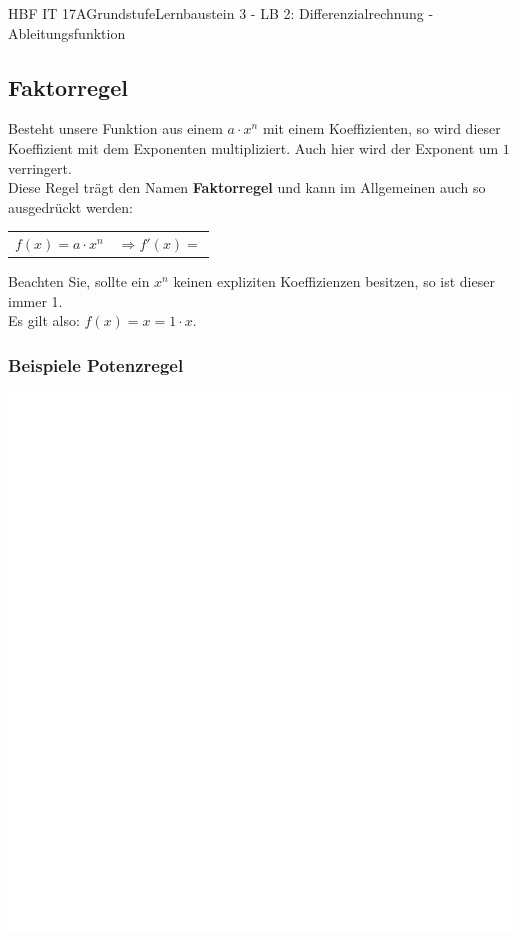 \documentclass[11pt,twocolumn,oneside,openany,headings=optiontotoc,11pt,numbers=noenddot]{article}
\begin{document}
\begin{worksheet}{HBF IT 17A}{Grundstufe}{Lernbaustein 3 - LB 2: Differenzialrechnung - Ableitungsfunktion}
		\subsection{Faktorregel}
		Besteht unsere Funktion aus einem \(a\cdot x^n\) mit einem Koeffizienten, so wird dieser Koeffizient mit dem Exponenten multipliziert. Auch hier wird der Exponent um \(1\) verringert.\\
		Diese Regel trägt den Namen \textbf{Faktorregel} und kann im Allgemeinen auch so ausgedrückt werden:
		\begin{framed}
			\noindent
			\begin{tabularx}{0.8\textwidth}{XX}
				\(f(x) = a\cdot x^n\) & \(\Rightarrow f'(x) = \)
			\end{tabularx}
		\end{framed}
		\color{codegray} Beachten Sie, sollte ein \(x^n\) keinen expliziten Koeffizienzen besitzen, so ist dieser immer 1.\\
		Es gilt also: \colorbox{green!5}{\(f(x) = x = 1\cdot x\)}.
		\normalcolor
		\subsubsection*{Beispiele Potenzregel}
		\includegraphics[scale=0.2]{../empty.jpg}\\

\end{worksheet}
\end{document}
